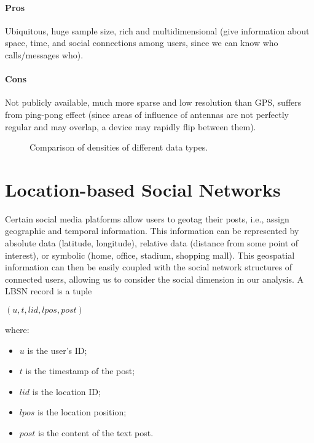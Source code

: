\paragraph{Pros}
Ubiquitous, huge sample size, rich and multidimensional (give information about space, time, and social connections among users, since we can know who calls/messages who).

\paragraph{Cons}
Not publicly available, much more sparse and low resolution than GPS, suffers from ping-pong effect (since areas of influence of antennas are not perfectly regular and may overlap, a device may rapidly flip between them).

\begin{figure}[!ht]
    \centering
    
    \caption{Comparison of densities of different data types.}
    \label{fig:mobile-data-comparison}
\end{figure}

\section{Location-based Social Networks}

Certain social media platforms allow users to geotag their posts, i.e., assign geographic and temporal information. This information can be represented by absolute data (latitude, longitude), relative data (distance from some point of interest), or symbolic (home, office, stadium, shopping mall).
This geospatial information can then be easily coupled with the social network structures of connected users, allowing us to consider the social dimension in our analysis. A LBSN record is a tuple
\begin{center}
    $(u, t, lid, lpos, post)$
\end{center}
where:
\begin{itemize}[itemsep=-5pt, label=-]
    \item $u$ is the user's ID;
    \item $t$ is the timestamp of the post;
    \item $lid$ is the location ID;
    \item $lpos$ is the location position;
    \item $post$ is the content of the text post.
\end{itemize}


